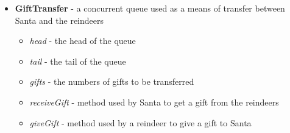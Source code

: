\documentclass{article}
\begin{document}
\begin{itemize}
\begin{itemize}
\begin{itemize}
                    \end{itemize}
            \end{itemize}
        \item \textbf{GiftTransfer} - a concurrent queue used as a means of transfer between Santa and the reindeers
            \begin{itemize}
                \item \textit{head} - the head of the queue
                \item \textit{tail} - the tail of the queue 
                \item \textit{gifts} - the numbers of gifts to be transferred
                \item \textit{receiveGift} - method used by Santa to get a gift from the reindeers
                \item \textit{giveGift} - method used by a reindeer to give a gift to Santa
            

\end{itemize}
\end{itemize}
\end{document}
